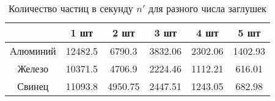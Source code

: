 \begin{table}[h!]
    \centering
    \begin{tabular}{|c|c|c|c|c|c|}
    \hline
             & 1 шт    & 2 шт    & 3 шт    & 4 шт    & 5 шт     \\ \hline
    Алюминий & 12482.5 & 6790.3  & 3832.06 & 2302.06 & 1402.93  \\ \hline
    Железо   & 10371.5 & 4706.9  & 2224.46 & 1112.21 & 616.01   \\ \hline
    Свинец   & 11093.8 & 4950.75 & 2447.51 & 1243.05 & 682.98   \\ \hline
    \end{tabular}
    \caption{Количество частиц в секунду $n'$ для разного числа заглушек}
    \label{tab:data}
\end{table}